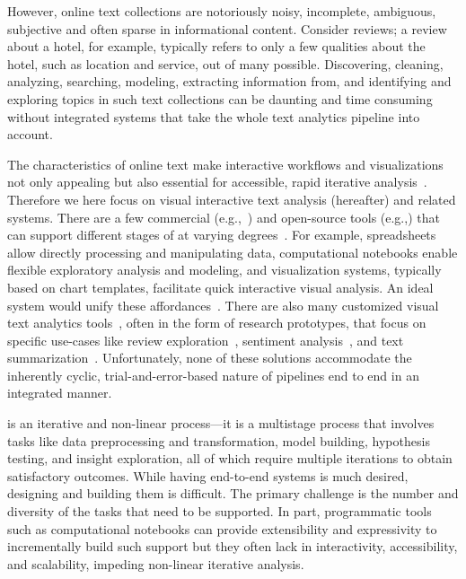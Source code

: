 However, online text collections are notoriously noisy, incomplete, ambiguous, subjective and often sparse in informational content. Consider reviews; a review about a hotel, for example, typically refers to only a few qualities about the hotel, such as location and service, out of many possible.  Discovering, cleaning, analyzing, searching, modeling, extracting information from, and identifying and exploring topics in such text collections can be daunting and time consuming without integrated systems that take the whole text analytics pipeline 
into account. 

The characteristics of online text make interactive workflows and visualizations not only appealing but also essential for accessible, rapid iterative analysis~\cite{ittoo2016text}.
Therefore we here focus on visual interactive text analysis (\vita hereafter) and related systems. There are a few commercial (e.g.,~\cite{sastextminer,rapidminer,tableau,powerbi}) 
and open-source tools (e.g.,\cite{perez2007ipython,nltk,gensim,spacy}) that can  support different stages of \vita at varying degrees~\cite{liu2018bridging, mlbazaar}. For example, spreadsheets allow directly processing and manipulating  data, computational notebooks enable flexible exploratory analysis and modeling, and visualization systems, typically based on chart templates, facilitate quick interactive visual analysis.  An ideal system would unify these affordances~\cite{kandel2011research,drosos2020wrex,wu2020b2}.  There are also many customized visual text analytics tools~\cite{liu2018bridging}, often in the form of research prototypes, that focus on specific use-cases like review exploration~\cite{zhang2020teddy}, sentiment analysis~\cite{kucher2018state}, and text summarization~\cite{carenini2006interactive}.
Unfortunately, none of these solutions accommodate the inherently cyclic, 
trial-and-error-based nature of \vita pipelines end to end in an integrated manner. 


\vita is an iterative and non-linear process---it is a multistage process that involves tasks like data preprocessing and transformation, model building, hypothesis testing, and insight exploration, all of which require multiple iterations to obtain satisfactory outcomes. While having end-to-end  \vita systems is much desired, designing and building them is difficult. The primary 
   challenge is the number and diversity of the tasks that need to be supported. In part, 
   programmatic tools such as computational notebooks can provide extensibility and 
   expressivity to incrementally build such support but they often lack in interactivity, 
   accessibility, and scalability, impeding non-linear iterative analysis. 

